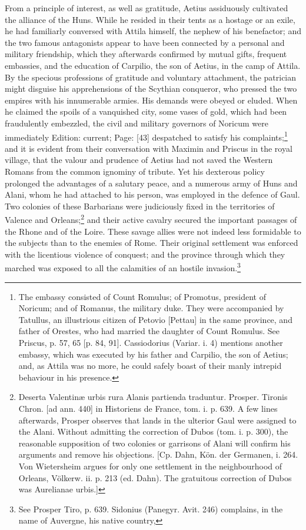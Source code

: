 From a principle of interest, as well as gratitude, Aetius assiduously cultivated the alliance of the Huns. While he resided in their tents as a hostage or an exile, he had familiarly conversed with Attila himself, the nephew of his benefactor; and the two famous antagonists appear to have been connected by a personal and military friendship, which they afterwards confirmed by mutual gifts, frequent embassies, and the education of Carpilio, the son of Aetius, in the camp of Attila. By the specious professions of gratitude and voluntary attachment, the patrician might disguise his apprehensions of the Scythian conqueror, who pressed the two empires with his innumerable armies. His demands were obeyed or eluded. When he claimed the spoils of a vanquished city, some vases of gold, which had been fraudulently embezzled, the civil and military governors of Noricum were immediately Edition: current; Page: [43] despatched to satisfy his complaints;\footnote{The embassy consisted of Count Romulus; of Promotus, president of Noricum; and of Romanus, the military duke. They were accompanied by Tatullus, an illustrious citizen of Petovio [Pettau] in the same province, and father of Orestes, who had married the daughter of Count Romulus. See Priscus, p. 57, 65 [p. 84, 91]. Cassiodorius (Variar. i. 4) mentions another embassy, which was executed by his father and Carpilio, the son of Aetius; and, as Attila was no more, he could safely boast of their manly intrepid behaviour in his presence.} and it is evident from their conversation with Maximin and Priscus in the royal village, that the valour and prudence of Aetius had not saved the Western Romans from the common ignominy of tribute. Yet his dexterous policy prolonged the advantages of a salutary peace, and a numerous army of Huns and Alani, whom he had attached to his person, was employed in the defence of Gaul. Two colonies of these Barbarians were judiciously fixed in the territories of Valence and Orleans;\footnote{Deserta Valentinæ urbis rura Alanis partienda traduntur. Prosper. Tironis Chron. [ad ann. 440] in Historiens de France, tom. i. p. 639. A few lines afterwards, Prosper observes that lands in the ulterior Gaul were assigned to the Alani. Without admitting the correction of Dubos (tom. i. p. 300), the reasonable supposition of two colonies or garrisons of Alani will confirm his arguments and remove his objections. [Cp. Dahn, Kön. der Germanen, i. 264. Von Wietersheim argues for only one settlement in the neighbourhood of Orleans, Völkerw. ii. p. 213 (ed. Dahn). The gratuitous correction of Dubos was Aurelianae urbis.]} and their active cavalry secured the important passages of the Rhone and of the Loire. These savage allies were not indeed less formidable to the subjects than to the enemies of Rome. Their original settlement was enforced with the licentious violence of conquest; and the province through which they marched was exposed to all the calamities of an hostile invasion.\footnote{See Prosper Tiro, p. 639. Sidonius (Panegyr. Avit. 246) complains, in the name of Auvergne, his native country,

}
